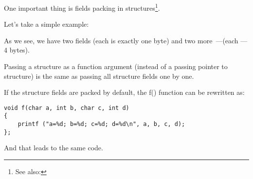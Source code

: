 \sectionold{\StructurePackingSectionName}
\label{structure_packing}

One important thing is fields packing in structures\footnote{See also: \URLWPDA}.

Let's take a simple example:



As we see, we have two \Tchar fields (each is exactly one byte) and two more~---\Tint (each --- 4 bytes).






Passing a structure as a function argument (instead of a passing pointer to structure) is the same
as passing all structure fields one by one.

If the structure fields are packed by default, the f() function can be rewritten as:

\begin{lstlisting}
void f(char a, int b, char c, int d)
{
    printf ("a=%d; b=%d; c=%d; d=%d\n", a, b, c, d);
};
\end{lstlisting}

And that leads to the same code.

